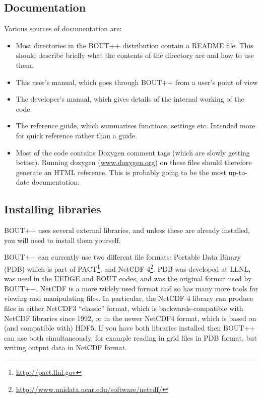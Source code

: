 \documentclass[12pt]{article}
\begin{document}
\subsection{Documentation}

Various sources of documentation are:
\begin{itemize}
\item Most directories in the BOUT++ distribution contain a README file. This should
describe briefly what the contents of the directory are and how to use them.
\item This user's manual, which goes through BOUT++ from a user's point of view
\item The developer's manual, which gives details of the internal working of the code.
\item The reference guide, which summarises functions, settings etc. Intended more for
quick reference rather than a guide.
\item Most of the code contains Doxygen comment tags (which are slowly getting better). 
Running doxygen (\url{www.doxygen.org}) on these files should therefore generate an HTML
reference. This is probably going to be the most up-to-date documentation.
\end{itemize}

\subsection{Installing libraries}
\label{sec:install}

BOUT++ uses several external libraries, and unless these are already installed,
you will need to install them yourself. 

BOUT++ can currently use two different file formats: Portable Data Binary
(PDB) which is part of PACT\footnote{\url{http://pact.llnl.gov}}, and
NetCDF-4\footnote{\url{http://www.unidata.ucar.edu/software/netcdf/}}.
PDB was developed at LLNL, was used in the UEDGE and BOUT codes, and 
was the original format used by BOUT++. NetCDF is a more widely used
format and so has many more tools for viewing and manipulating files.
In particular, the NetCDF-4 library can produce files in either
NetCDF3 ``classic'' format, which is backwards-compatible with NetCDF
libraries since 1992, or in the newer NetCDF4 format, which is based
on (and compatible with) HDF5. If you have both libraries installed then
BOUT++ can use both simultaneously, for example reading in grid files in PDB
format, but writing output data in NetCDF format. 
\end{document}
